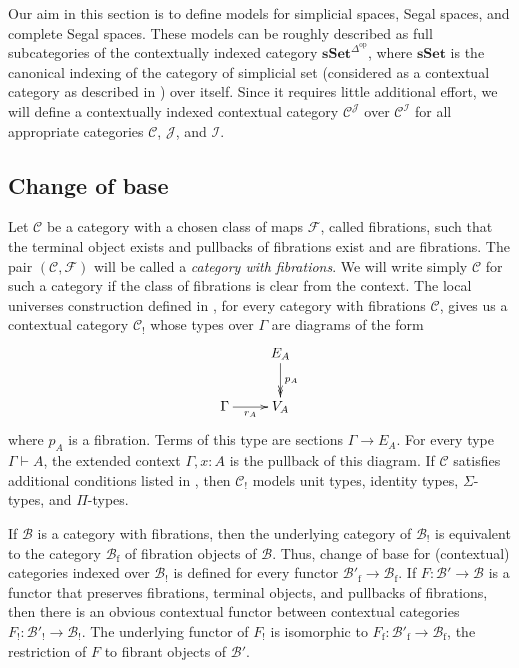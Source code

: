 \documentclass[reqno]{amsart}
\theoremstyle{definition}
\theoremstyle{remark}
\newcommand{\fs}[1]{\mathrm{#1}}
\newcommand{\cat}[1]{\mathbf{#1}}
\newcommand{\scat}[1]{\mathcal{#1}}
\newcommand{\Fib}{\mathcal{F}}
\newcommand{\sSet}{\cat{sSet}}
\numberwithin{figure}{section}
\begin{document}
Our aim in this section is to define models for simplicial spaces, Segal spaces, and complete Segal spaces.
These models can be roughly described as full subcategories of the contextually indexed category $\sSet^{\Delta^\fs{op}}$,
where $\sSet$ is the canonical indexing of the category of simplicial set (considered as a contextual category as described in \cite{kap-lum-voe}) over itself.
Since it requires little additional effort, we will define a contextually indexed contextual category $\scat{C}^\scat{J}$ over $\scat{C}^\scat{I}$ for all appropriate categories $\scat{C}$, $\scat{J}$, and $\scat{I}$.

\subsection{Change of base}

Let $\scat{C}$ be a category with a chosen class of maps $\Fib$, called fibrations, such that the terminal object exists and pullbacks of fibrations exist and are fibrations.
The pair $(\scat{C},\Fib)$ will be called a \emph{category with fibrations}.
We will write simply $\scat{C}$ for such a category if the class of fibrations is clear from the context.
The local universes construction defined in \cite{local-universes}, for every category with fibrations $\scat{C}$,
gives us a contextual category $\scat{C}_!$ whose types over $\Gamma$ are diagrams of the form
\[ \xymatrix{                       & E_A \ar@{->>}[d]^{p_A} \\
              \Gamma \ar[r]_-{r_A}  & V_A
            } \]
where $p_A$ is a fibration.
Terms of this type are sections $\Gamma \to E_A$.
For every type $\Gamma \vdash A$, the extended context $\Gamma, x : A$ is the pullback of this diagram.
If $\scat{C}$ satisfies additional conditions listed in \cite[Definition~4.2.1]{local-universes}, then $\scat{C}_!$ models unit types, identity types, $\Sigma$-types, and $\Pi$-types.

If $\scat{B}$ is a category with fibrations, then the underlying category of $\scat{B}_!$ is equivalent to the category $\scat{B}_\fs{f}$ of fibration objects of $\scat{B}$.
Thus, change of base for (contextual) categories indexed over $\scat{B}_!$ is defined for every functor $\scat{B}'_\fs{f} \to \scat{B}_\fs{f}$.
If $F : \scat{B}' \to \scat{B}$ is a functor that preserves fibrations, terminal objects, and pullbacks of fibrations, then there is an obvious contextual functor between contextual categories $F_! : \scat{B}'_! \to \scat{B}_!$.
The underlying functor of $F_!$ is isomorphic to $F_\fs{f} : \scat{B}'_\fs{f} \to \scat{B}_\fs{f}$, the restriction of $F$ to fibrant objects of $\scat{B}'$.
\end{document}

